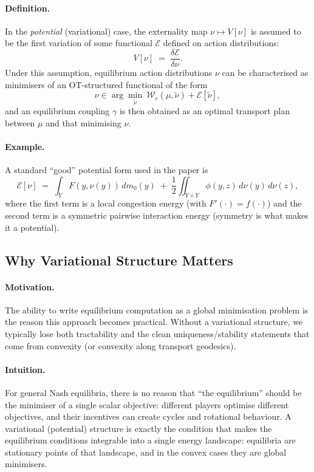 \paragraph{Definition.}
In the \emph{potential} (variational) case, the externality map $\nu\mapsto V[\nu]$ is assumed to be the first variation
of some functional $\mathcal{E}$ defined on action distributions:
$$
V[\nu] \;=\; \frac{\delta \mathcal{E}}{\delta \nu}.
$$
Under this assumption, equilibrium action distributions $\nu$ can be characterised as minimisers of an OT-structured
functional of the form
$$
\nu \in \arg\min_{\tilde\nu}\ \mathcal{W}_c(\mu,\tilde\nu) + \mathcal{E}[\tilde\nu],
$$
and an equilibrium coupling $\gamma$ is then obtained as an optimal transport plan between $\mu$ and that minimising
$\nu$.

\paragraph{Example.}
A standard ``good'' potential form used in the paper is
$$
\mathcal{E}[\nu] \;=\; \int_Y F(y,\nu(y))\,dm_0(y) \;+\; \frac12\iint_{Y\times Y} \phi(y,z)\,d\nu(y)\,d\nu(z),
$$
where the first term is a local congestion energy (with $F'(\cdot)=f(\cdot)$) and the second term is a symmetric pairwise
interaction energy (symmetry is what makes it a potential).

\subsection{Why Variational Structure Matters}\label{sec:cn_variational_importance}

\paragraph{Motivation.}
The ability to write equilibrium computation as a global minimisation problem is the reason this approach becomes
practical. Without a variational structure, we typically lose both tractability and the clean uniqueness/stability
statements that come from convexity (or convexity along transport geodesics).

\paragraph{Intuition.}
For general Nash equilibria, there is no reason that ``the equilibrium'' should be the minimiser of a single scalar
objective: different players optimise different objectives, and their incentives can create cycles and rotational
behaviour. A variational (potential) structure is exactly the condition that makes the equilibrium conditions integrable
into a single energy landscape: equilibria are stationary points of that landscape, and in the convex cases they are
global minimisers.

